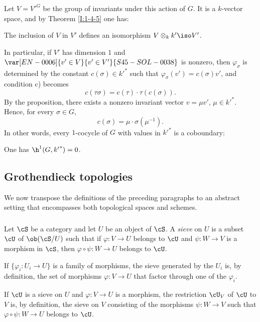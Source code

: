 Let $V={V'}^G$ be the group of invariants under this action of $G$. It
is a $k$-vector space, and by Theorem \ref{I:1-4-5} one has:

\begin{proposition}\label{I:1-5-2}
The inclusion of $V$ in $V'$ defines an isomorphism
$V\otimes_k k'\iso V'$.
\end{proposition}

In particular, if $V'$ has dimension $1$ and $\var[EN-0006]{v'\in V}{v'\in V'}{S45-SOL-0038}$ is nonzero, then
$\varphi_\sigma$ is determined by the constant
$c(\sigma)\in {k'}^*$ such that
$\varphi_\sigma(v')=c(\sigma)v'$, and condition c) becomes
\[
  c(\tau\sigma) = c(\tau)\cdot \tau(c(\sigma))\text{.}
\]
By the proposition, there exists a nonzero invariant vector
$v=\mu v'$, $\mu\in {k'}^*$. Hence, for every $\sigma\in G$,
\[
  c(\sigma) = \mu\cdot \sigma(\mu^{-1})\text{.}
\]
In other words, every $1$-cocycle of $G$ with values in
${k'}^*$ is a coboundary:

\begin{corollary}\label{I:1-5-3}
One has $\h^1(G,{k'}^*)=0$.
\end{corollary}

\subsection{Grothendieck topologies}\label{I:1-6}

We now transpose the definitions of the preceding paragraphs to an
abstract setting that encompasses both topological spaces and schemes.

\subsubsection{}\label{I:1-6-1}

Let $\cS$ be a category and let $U$ be an object of $\cS$. A
\emph{sieve} on $U$ is a subset $\cU$ of $\ob(\cS/U)$ such that if
$\varphi:V\to U$ belongs to $\cU$ and $\psi:W\to V$ is a morphism in
$\cS$, then $\varphi\circ\psi:W\to U$ belongs to $\cU$.

If $\{\varphi_i:U_i\to U\}$ is a family of morphisms, the sieve generated
by the $U_i$ is, by definition, the set of morphisms $\varphi:V\to U$
that factor through one of the $\varphi_i$.

If $\cU$ is a sieve on $U$ and $\varphi:V\to U$ is a morphism, the
restriction $\cU_V$ of $\cU$ to $V$ is, by definition, the sieve on
$V$ consisting of the morphisms $\psi:W\to V$ such that
$\varphi\circ\psi:W\to U$ belongs to $\cU$.

